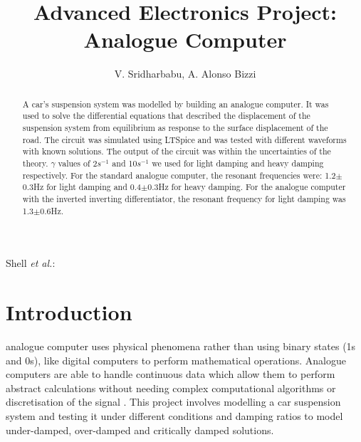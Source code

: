 \documentclass[journal]{Imperial_lab_report}
\begin{document}
%

\title{Advanced Electronics Project: Analogue Computer}


\author{V. Sridharbabu, A. Alonso Bizzi}%




%
{Shell \MakeLowercase{\textit{et al.}}:}

\maketitle

\begin{abstract}

A car's suspension system was modelled by building an analogue computer. It was used to solve the differential equations that described the displacement of the suspension system from equilibrium as response to the surface displacement of the road. The circuit was simulated using LTSpice and was tested with different waveforms with known solutions. The output of the circuit was within the uncertainties of the theory. $\gamma$ values of 2$s^{-1}$ and 10$s^{-1}$ we used for light damping and heavy damping respectively. For the standard analogue computer, the resonant frequencies were: 1.2$\pm$0.3Hz for light damping and 0.4$\pm$0.3Hz for heavy damping. For the analogue computer with the inverted inverting differentiator, the resonant frequency for light damping was 1.3$\pm$0.6Hz. 

\end{abstract}


\section{Introduction}

 analogue computer\cite{manual} uses physical phenomena rather than using binary states (1s and 0s), like digital computers to perform mathematical operations. Analogue computers are able to handle continuous data which allow them to perform abstract calculations without needing complex computational algorithms or discretisation of the signal \cite{digitalvanalogue}. This project involves modelling a car suspension system and testing it under different conditions and damping ratios to model under-damped, over-damped and critically damped solutions.
\end{document}
